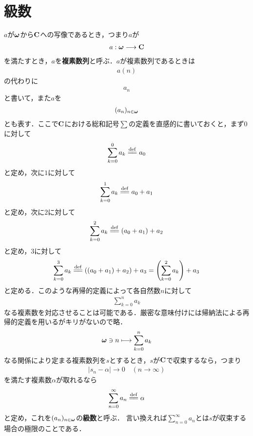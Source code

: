 \section{級数}
	
	$a$が${\boldsymbol \omega}$から$\mathbf{C}$への写像であるとき，つまり$a$が
	\begin{align}
		a: {\boldsymbol \omega} \longrightarrow \mathbf{C}
	\end{align}
	を満たすとき，$a$を{\bf 複素数列}と呼ぶ．$a$が複素数列であるときは
	\begin{align}
		a(n)
	\end{align}
	の代わりに
	\begin{align}
		a_n
	\end{align}
	と書いて，また$a$を
	\begin{align}
		(a_n)_{n \in {\boldsymbol \omega}}
	\end{align}
	とも表す．ここで$\mathbf{C}$における総和記号$\sum$の定義を直感的に書いておくと，まず$0$に対して
	\begin{align}
		\sum_{k=0}^0 a_k \defeq a_0
	\end{align}
	と定め，次に$1$に対して
	\begin{align}
		\sum_{k=0}^1 a_k \defeq a_0 + a_1
	\end{align}
	と定め，次に$2$に対して
	\begin{align}
		\sum_{k=0}^2 a_k \defeq (a_0 + a_1) + a_2
	\end{align}
	と定め，$3$に対して
	\begin{align}
		\sum_{k=0}^3 a_k \defeq ((a_0 + a_1) + a_2) + a_3 = \left(\sum_{k=0}^2 a_k\right) + a_3
	\end{align}
	と定める．このような再帰的定義によって各自然数$n$に対して
	\begin{align}
		\sum_{k=0}^n a_k
	\end{align}
	なる複素数を対応させることは可能である．厳密な意味付けには帰納法による再帰的定義を用いるがキリがないので略．
	\begin{align}
		{\boldsymbol \omega} \ni n \longmapsto \sum_{k=0}^n a_k
	\end{align}
	なる関係により定まる複素数列を$s$とするとき，$s$が$\mathbf{C}$で収束するなら，つまり
	\begin{align}
		|s_n - \alpha| \longrightarrow 0\quad (n \longrightarrow \infty)
	\end{align}
	を満たす複素数$\alpha$が取れるなら
	\begin{align}
		\sum_{n=0}^\infty a_n \defeq \alpha
	\end{align}
	と定め，これを$(a_n)_{n \in {\boldsymbol \omega}}$の{\bf 級数}と呼ぶ．
	言い換えれば$\sum_{n=0}^\infty a_n$とは$s$が収束する場合の極限のことである．
	
